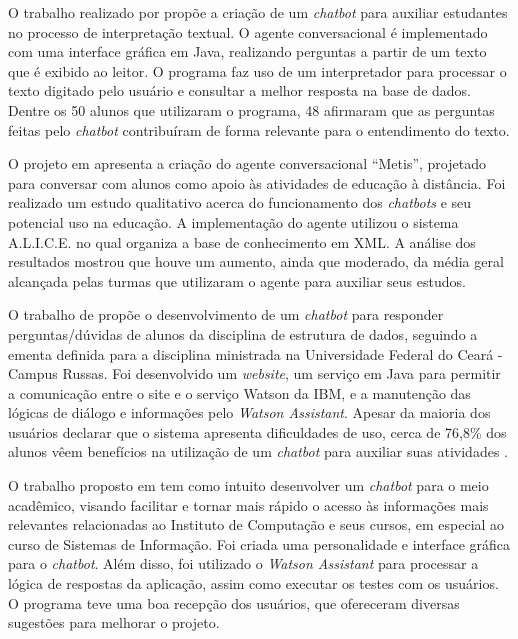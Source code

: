 \documentclass[12pt]{article}
\begin{document}
O trabalho realizado por \cite{bulhoes:20} propõe a criação de um {\itshape chatbot} para auxiliar estudantes no processo de interpretação textual. O agente conversacional é implementado com uma interface gráfica em Java, realizando perguntas a partir de um texto que é exibido ao leitor. O programa faz uso de um interpretador para processar o texto digitado pelo usuário e consultar a melhor resposta na base de dados. Dentre os 50 alunos que utilizaram o programa, 48 afirmaram que as perguntas feitas pelo {\itshape chatbot} contribuíram de forma relevante para o entendimento do texto.


O projeto em \cite{lucchesi:18} apresenta a criação do agente conversacional “Metis”, projetado para conversar com alunos como apoio às atividades de educação à distância. Foi realizado um estudo qualitativo acerca do funcionamento dos {\itshape chatbots} e seu potencial uso na educação. A implementação do agente utilizou o sistema A.L.I.C.E. no qual organiza a base de conhecimento em XML. A análise dos resultados mostrou que houve um aumento, ainda que moderado, da média geral alcançada pelas turmas que utilizaram o agente para auxiliar seus estudos.

O trabalho de \cite{araujo:20} propõe o desenvolvimento de um {\itshape chatbot} para responder perguntas/dúvidas de alunos da disciplina de estrutura de dados, seguindo a ementa definida para a disciplina ministrada na Universidade Federal do Ceará - Campus Russas. Foi desenvolvido um {\itshape website}, um serviço em Java para permitir a comunicação entre o site e o serviço Watson da IBM, e a manutenção das lógicas de diálogo e informações pelo {\itshape Watson Assistant}. Apesar da maioria dos usuários declarar que o sistema apresenta dificuldades de uso, cerca de 76,8\% dos alunos  vêem benefícios na utilização de um {\itshape chatbot} para auxiliar suas atividades   .

O trabalho proposto em \cite{catbot:19} tem como intuito desenvolver um {\itshape chatbot} para o meio acadêmico, visando facilitar e tornar mais rápido o acesso às informações mais relevantes relacionadas ao Instituto de Computação e seus cursos, em especial ao curso de Sistemas de Informação. Foi criada uma personalidade e interface gráfica para o {\itshape chatbot}. Além disso, foi utilizado o {\itshape Watson Assistant} para processar a lógica de respostas da aplicação, assim como executar os testes com os usuários. O programa teve uma boa recepção dos usuários, que ofereceram diversas sugestões para melhorar o projeto.
\end{document}
